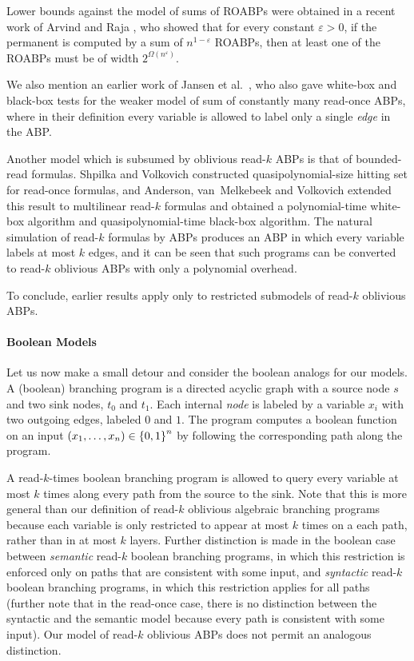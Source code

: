 \documentclass[11pt]{article}
\def\epsilon{\varepsilon} %
\let\eps\epsilon
\begin{document}
Lower bounds against the model of sums of ROABPs were obtained in a recent work of Arvind and Raja \cite{AR16}, who showed that for every constant $\eps >0$, if the permanent is computed by a sum of $n^{1-\eps}$ ROABPs, then at least one of the ROABPs must be of width $2^{\Omega(n^{\epsilon})}$.

We also mention an earlier work of Jansen et al.\ \cite{JQS10}, who also gave white-box and black-box tests for the weaker model of sum of constantly many read-once ABPs, where in their definition every variable is allowed to label only a single {\em edge} in the ABP.

Another model which is subsumed by oblivious read-$k$ ABPs is that of bounded-read formulas.
Shpilka and Volkovich \cite{SV15} constructed quasipolynomial-size hitting set for read-once formulas, and Anderson, van~Melkebeek and Volkovich \cite{amv15} extended this result to multilinear read-$k$ formulas and obtained a polynomial-time white-box algorithm and quasipolynomial-time black-box algorithm.
The natural simulation of read-$k$ formulas by ABPs produces an ABP in which every variable labels at most $k$ edges, and it can be seen that such programs can be converted to read-$k$ oblivious ABPs with only a polynomial overhead.

To conclude, earlier results apply only to restricted submodels of read-$k$ oblivious ABPs.

\paragraph{Boolean Models}

Let us now make a small detour and consider the boolean analogs for our models.
A (boolean) branching program is a directed acyclic graph with a source node $s$ and two sink nodes, $t_0$ and $t_1$.
Each internal {\em node} is labeled by a variable $x_i$ with two outgoing edges, labeled $0$ and $1$.
The program computes a boolean function on an input $(x_1, \ldots, x_n) \in \left\{ 0,1 \right\}^n$ by following the corresponding path along the program.

A read-$k$-times boolean branching program is allowed to query every variable at most $k$ times along every path from the source to the sink.
Note that this is more general than our definition of read-$k$ oblivious algebraic branching programs because each variable is only restricted to appear at most $k$ times on a each path, rather than in at most $k$ layers.
Further distinction is made in the boolean case between {\em semantic} read-$k$ boolean branching programs, in which this restriction is enforced only on paths that are consistent with some input, and  {\em syntactic} read-$k$ boolean branching programs, in which this restriction applies for all paths (further note that in the read-once case, there is no distinction between the syntactic and the semantic model because every path is consistent with some input).  
Our model of read-$k$ oblivious ABPs does not permit an analogous distinction.
\end{document}
